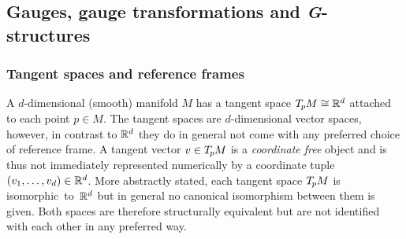 

\subsection{Gauges, gauge transformations and \textit{G}-structures}
\label{sec:21_main}



\subsubsection{Tangent spaces and reference frames}
\label{sec:gauges_gauge_trafos}


A $d$-dimensional (smooth) manifold $M$ has a tangent space $T_{\mkern-1.5mu p}\mkern-.5muM\cong\mathbb{R}^d$ attached to each point $p\in M.$
The tangent spaces are $d$-dimensional vector spaces, however, in contrast to $\mathbb{R}^d$ they do in general not come with any preferred choice of reference frame.
A tangent vector $v\in T_{\mkern-1.5mu p}\mkern-.5muM$ is a \emph{coordinate free} object and is thus not immediately represented numerically by a coordinate tuple $(v_1,\dots,v_d)\in\mathbb{R}^d$.
More abstractly stated, each tangent space $T_{\mkern-1.5mu p}\mkern-.5muM$ is isomorphic~to~$\mathbb{R}^d$ but in general no canonical isomorphism between them is given.
Both spaces are therefore structurally equivalent but are not identified with each other in any preferred way.


